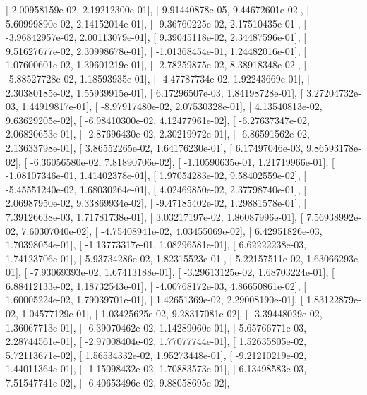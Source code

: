 \documentclass{article}
\begin{document}
       [  2.00958159e-02,   2.19212300e-01],
       [  9.91440878e-05,   9.44672601e-02],
       [  5.60999890e-02,   2.14152014e-01],
       [ -9.36760225e-02,   2.17510435e-01],
       [ -3.96842957e-02,   2.00113079e-01],
       [  9.39045118e-02,   2.34487596e-01],
       [  9.51627677e-02,   2.30998678e-01],
       [ -1.01368454e-01,   1.24482016e-01],
       [  1.07600601e-02,   1.39601219e-01],
       [ -2.78259875e-02,   8.38918348e-02],
       [ -5.88527728e-02,   1.18593935e-01],
       [ -4.47787734e-02,   1.92243669e-01],
       [  2.30380185e-02,   1.55939915e-01],
       [  6.17296507e-03,   1.84198728e-01],
       [  3.27204732e-03,   1.44919817e-01],
       [ -8.97917480e-02,   2.07530328e-01],
       [  4.13540813e-02,   9.63629205e-02],
       [ -6.98410300e-02,   4.12477961e-02],
       [ -6.27637347e-02,   2.06820653e-01],
       [ -2.87696430e-02,   2.30219972e-01],
       [ -6.86591562e-02,   2.13633798e-01],
       [  3.86552265e-02,   1.64176230e-01],
       [  6.17497046e-03,   9.86593178e-02],
       [ -6.36056580e-02,   7.81890706e-02],
       [ -1.10590635e-01,   1.21719966e-01],
       [ -1.08107346e-01,   1.41402378e-01],
       [  1.97054283e-02,   9.58402559e-02],
       [ -5.45551240e-02,   1.68030264e-01],
       [  4.02469850e-02,   2.37798740e-01],
       [  2.06987950e-02,   9.33869934e-02],
       [ -9.47185402e-02,   1.29881578e-01],
       [  7.39126638e-03,   1.71781738e-01],
       [  3.03217197e-02,   1.86087996e-01],
       [  7.56938992e-02,   7.60307040e-02],
       [ -4.75408941e-02,   4.03455069e-02],
       [  6.42951826e-03,   1.70398054e-01],
       [ -1.13773317e-01,   1.08296581e-01],
       [  6.62222238e-03,   1.74123706e-01],
       [  5.93734286e-02,   1.82315523e-01],
       [  5.22157511e-02,   1.63066293e-01],
       [ -7.93069393e-02,   1.67413188e-01],
       [ -3.29613125e-02,   1.68703224e-01],
       [  6.88412133e-02,   1.18732543e-01],
       [ -4.00768172e-03,   4.86650861e-02],
       [  1.60005224e-02,   1.79039701e-01],
       [  1.42651369e-02,   2.29008190e-01],
       [  1.83122879e-02,   1.04577129e-01],
       [  1.03425625e-02,   9.28317081e-02],
       [ -3.39448029e-02,   1.36067713e-01],
       [ -6.39070462e-02,   1.14289060e-01],
       [  5.65766771e-03,   2.28744561e-01],
       [ -2.97008404e-02,   1.77077744e-01],
       [  1.52635805e-02,   5.72113671e-02],
       [  1.56534332e-02,   1.95273448e-01],
       [ -9.21210219e-02,   1.44011364e-01],
       [ -1.15098432e-02,   1.70883573e-01],
       [  6.13498583e-03,   7.51547741e-02],
       [ -6.40653496e-02,   9.88058695e-02],
\end{document}
